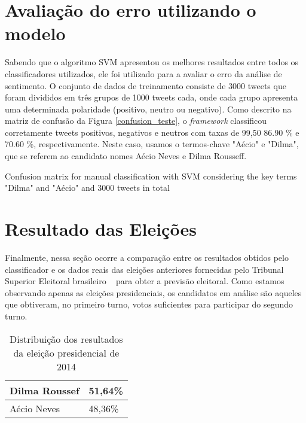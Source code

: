\newpage

\section{Avaliação do erro utilizando o modelo}

Sabendo que o algoritmo \acrshort{SVM} apresentou os melhores resultados entre todos os classificadores utilizados, 
ele foi utilizado para a avaliar o erro da análise de sentimento. O conjunto de dados de treinamento consiste
de 3000 tweets que foram divididos em três grupos de
1000 tweets cada, onde cada grupo apresenta uma determinada polaridade
(positivo, neutro ou negativo). Como descrito na matriz de confusão da Figura \ref{confusion_teste}, o \textit{framework} classificou corretamente
tweets positivos, negativos e neutros com taxas de 99,50%
86.90 \% e 70.60 \%, respectivamente. Neste caso, usamos o
termos-chave "Aécio" e "Dilma", que se referem ao candidato
nomes Aécio Neves e Dilma Rousseff.

Confusion matrix for manual classification with SVM considering the
key terms "Dilma" and "Aécio" and 3000 tweets in total

%


\section{Resultado das Eleições}

Finalmente, nessa seção ocorre a comparação
entre os resultados obtidos pelo classificador e os dados
reais das eleições anteriores fornecidas pelo Tribunal Superior
Eleitoral brasileiro ~\cite{TSE} para obter a previsão eleitoral. Como
estamos observando apenas as eleições presidenciais, os candidatos
em análise são aqueles que obtiveram, no primeiro
turno, votos suficientes para participar do segundo turno.

\begin{table}[tbp]
    \centering
    \caption{Distribuição dos resultados da eleição presidencial de 2014}
    \label{tb:eleicoes2014}
    \begin{tabular}{ll}
    \hline
    Dilma Roussef & 51,64\% \\ \hline
    Aécio Neves & 48,36\% \\ \hline
    \end{tabular}
\end{table}

